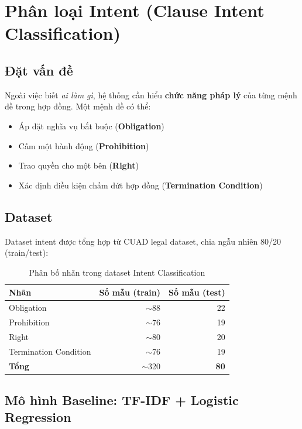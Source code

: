 \section{Phân loại Intent (Clause Intent Classification)}

\subsection{Đặt vấn đề}

Ngoài việc biết \textit{ai làm gì}, hệ thống cần hiểu \textbf{chức năng pháp lý} của từng mệnh đề trong hợp đồng. Một mệnh đề có thể:
\begin{itemize}
    \item Áp đặt nghĩa vụ bắt buộc (\textbf{Obligation})
    \item Cấm một hành động (\textbf{Prohibition})
    \item Trao quyền cho một bên (\textbf{Right})
    \item Xác định điều kiện chấm dứt hợp đồng (\textbf{Termination Condition})
\end{itemize}

\subsection{Dataset}

Dataset intent được tổng hợp từ CUAD legal dataset, chia ngẫu nhiên 80/20 (train/test):

\begin{table}[H]
    \centering
    \caption{Phân bố nhãn trong dataset Intent Classification}
    \label{tab:intent_dist}
    \begin{tabular}{|l|r|r|}
        \hline
        \textbf{Nhãn} & \textbf{Số mẫu (train)} & \textbf{Số mẫu (test)} \\ \hline
        Obligation            & $\sim$88  & 22 \\ \hline
        Prohibition           & $\sim$76  & 19 \\ \hline
        Right                 & $\sim$80  & 20 \\ \hline
        Termination Condition & $\sim$76  & 19 \\ \hline
        \textbf{Tổng}         & $\sim$320 & \textbf{80} \\ \hline
    \end{tabular}
\end{table}

\subsection{Mô hình Baseline: TF-IDF + Logistic Regression}

